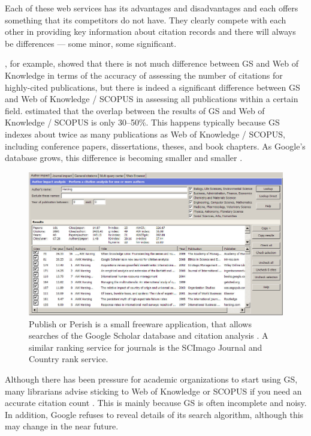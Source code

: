 \documentclass[graybox,envcountchap,sectrefs,UStrade]{svmono}
\begin{document}
Each of these web services has its advantages and disadvantages and each offers something that its competitors do not have. They clearly compete with each other in providing key information about citation records and there will always be differences --- some minor, some significant.\par

\citet{Bauer2005DLIB}, for example, showed that there is not much difference between GS and Web of Knowledge in terms of the accuracy of assessing the number of citations for highly-cited publications, but there is indeed a significant difference between GS and Web of Knowledge / SCOPUS in assessing all publications within a certain field. \citet{Meho2007JASIST} estimated that the overlap between the results of GS and Web of Knowledge / SCOPUS is only 30--50\%. This happens typically because GS indexes about twice as many publications as Web of Knowledge / SCOPUS, including conference papers, dissertations, theses, and book chapters. As Google's database grows, this difference is becoming smaller and smaller \citep{Harzing2010}. \par

\begin{figure}
\begin{center}
  \includegraphics[width=.85\textwidth]{Fig_PoP_on_Harzing.jpg}
\caption{\textsf{Publish or Perish} is a small freeware application, that allows searches of the Google Scholar database and citation analysis \citep{Harzing2010}. A similar ranking service for journals is the SCImago Journal and Country rank service.} \label{Fig:PoP_on_Harzing}
\end{center}
\end{figure}

Although there has been pressure for academic organizations to start using GS, many librarians advise sticking to Web of Knowledge or SCOPUS if you need an accurate citation count \citep{Giles2005Nature}. This is mainly because GS is often incomplete and noisy. In addition, Google refuses to reveal details of its search algorithm, although this may change in the near future. \par
\end{document}
